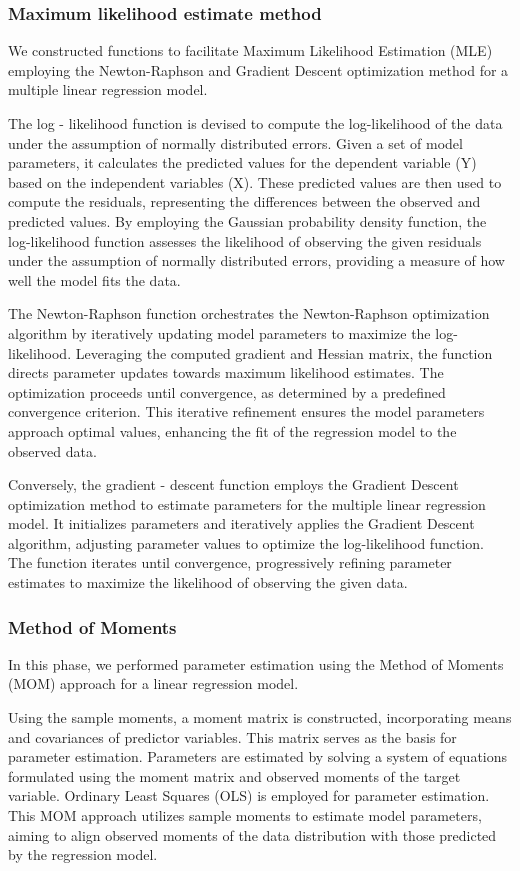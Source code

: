 \documentclass[12pt]{article}
\begin{document}
	\subsubsection{Maximum likelihood estimate method}
	We constructed functions to facilitate Maximum Likelihood Estimation (MLE) employing the Newton-Raphson and Gradient Descent optimization method for a multiple linear regression model.
	
	The log - likelihood function is devised to compute the log-likelihood of the data under the assumption of normally distributed errors. Given a set of model parameters, it calculates the predicted values for the dependent variable (Y) based on the independent variables (X). These predicted values are then used to compute the residuals, representing the differences between the observed and predicted values. By employing the Gaussian probability density function, the log-likelihood function assesses the likelihood of observing the given residuals under the assumption of normally distributed errors, providing a measure of how well the model fits the data.
	
	The Newton-Raphson function orchestrates the Newton-Raphson optimization algorithm by iteratively updating model parameters to maximize the log-likelihood. Leveraging the computed gradient and Hessian matrix, the function directs parameter updates towards maximum likelihood estimates. The optimization proceeds until convergence, as determined by a predefined convergence criterion. This iterative refinement ensures the model parameters approach optimal values, enhancing the fit of the regression model to the observed data.
	
	Conversely, the gradient - descent function employs the Gradient Descent optimization method to estimate parameters for the multiple linear regression model. It initializes parameters and iteratively applies the Gradient Descent algorithm, adjusting parameter values to optimize the log-likelihood function. The function iterates until convergence, progressively refining parameter estimates to maximize the likelihood of observing the given data. 
	
	\subsubsection{Method of Moments}
	In this phase, we performed parameter estimation using the Method of Moments (MOM) approach for a linear regression model. 
	
	Using the sample moments, a moment matrix is constructed, incorporating means and covariances of predictor variables. This matrix serves as the basis for parameter estimation. Parameters are estimated by solving a system of equations formulated using the moment matrix and observed moments of the target variable. Ordinary Least Squares (OLS) is employed for parameter estimation. This MOM approach utilizes sample moments to estimate model parameters, aiming to align observed moments of the data distribution with those predicted by the regression model.
	
\end{document}
